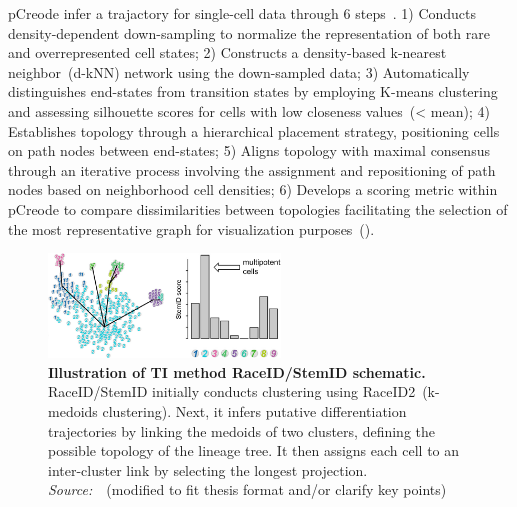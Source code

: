 \begin{description}
  pCreode infer a trajactory for single-cell data through 6 steps~\citep{herring2018pCreode}. 1) Conducts density-dependent down-sampling to normalize the representation of both rare and overrepresented cell states; 2) Constructs a density-based k-nearest neighbor~(d-kNN) network using the down-sampled data; 3) Automatically distinguishes end-states from transition states by employing K-means clustering and assessing silhouette scores for cells with low closeness values~(< mean); 4) Establishes topology through a hierarchical placement strategy, positioning cells on path nodes between end-states; 5) Aligns topology with maximal consensus through an iterative process involving the assignment and repositioning of path nodes based on neighborhood cell densities; 6) Develops a scoring metric within pCreode to compare dissimilarities between topologies facilitating the selection of the most representative graph for visualization purposes~().

  \begin{figure}[h!]
  	\centering
  	\includegraphics[width=0.55\textwidth]{TI_Alg_StemID/fig}
  	\vspace{0.1cm}
  	\caption[Illustration of TI method RaceID/StemID schematic.]{\textbf{Illustration of TI method RaceID/StemID schematic.}
  	RaceID/StemID initially conducts clustering using RaceID2~(k-medoids clustering). Next, it infers putative differentiation trajectories by linking the medoids of two clusters, defining the possible topology of the lineage tree. It then assigns each cell to an inter-cluster link by selecting the longest projection. \emph{Source:~\cite{albergante2020ElPiGraph}}~(modified to fit thesis format and/or clarify key points)
  	}
  	\label{fig:TI_Alg_StemID}
  \end{figure}


\end{description}
